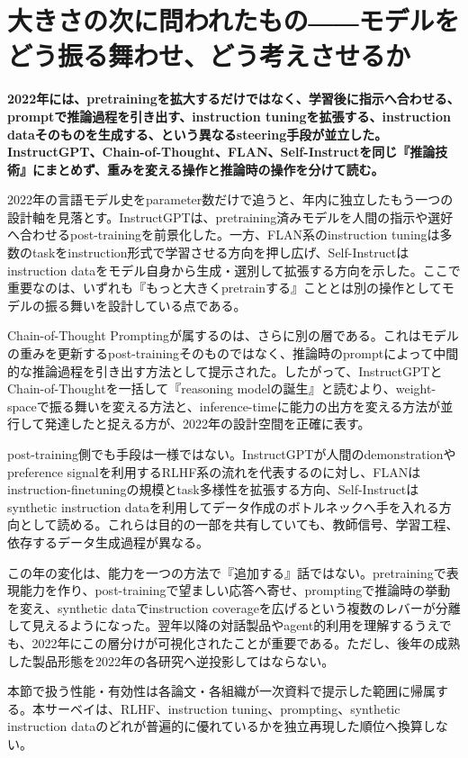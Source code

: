 \section{大きさの次に問われたもの――モデルをどう振る舞わせ、どう考えさせるか}
\label{pkg:steering-reasoning}
\noindent\textbf{2022年には、pretrainingを拡大するだけではなく、学習後に指示へ合わせる、promptで推論過程を引き出す、instruction tuningを拡張する、instruction dataそのものを生成する、という異なるsteering手段が並立した。InstructGPT、Chain-of-Thought、FLAN、Self-Instructを同じ『推論技術』にまとめず、重みを変える操作と推論時の操作を分けて読む。}\autocite{src-0c551201e765,src-87477ad8b476,src-a17359c66f6b,src-e58f1e9c8754,src-fadb2b92c538}

2022年の言語モデル史をparameter数だけで追うと、年内に独立したもう一つの設計軸を見落とす。InstructGPTは、pretraining済みモデルを人間の指示や選好へ合わせるpost-trainingを前景化した。一方、FLAN系のinstruction tuningは多数のtaskをinstruction形式で学習させる方向を押し広げ、Self-Instructはinstruction dataをモデル自身から生成・選別して拡張する方向を示した。ここで重要なのは、いずれも『もっと大きくpretrainする』こととは別の操作としてモデルの振る舞いを設計している点である。\autocite{src-0c551201e765,src-87477ad8b476,src-e58f1e9c8754,src-fadb2b92c538}


Chain-of-Thought Promptingが属するのは、さらに別の層である。これはモデルの重みを更新するpost-trainingそのものではなく、推論時のpromptによって中間的な推論過程を引き出す方法として提示された。したがって、InstructGPTとChain-of-Thoughtを一括して『reasoning modelの誕生』と読むより、weight-spaceで振る舞いを変える方法と、inference-timeに能力の出方を変える方法が並行して発達したと捉える方が、2022年の設計空間を正確に表す。\autocite{src-87477ad8b476,src-a17359c66f6b,src-e58f1e9c8754}


post-training側でも手段は一様ではない。InstructGPTが人間のdemonstrationやpreference signalを利用するRLHF系の流れを代表するのに対し、FLANはinstruction-finetuningの規模とtask多様性を拡張する方向、Self-Instructはsynthetic instruction dataを利用してデータ作成のボトルネックへ手を入れる方向として読める。これらは目的の一部を共有していても、教師信号、学習工程、依存するデータ生成過程が異なる。\autocite{src-0c551201e765,src-87477ad8b476,src-e58f1e9c8754,src-fadb2b92c538}


この年の変化は、能力を一つの方法で『追加する』話ではない。pretrainingで表現能力を作り、post-trainingで望ましい応答へ寄せ、promptingで推論時の挙動を変え、synthetic dataでinstruction coverageを広げるという複数のレバーが分離して見えるようになった。翌年以降の対話製品やagent的利用を理解するうえでも、2022年にこの層分けが可視化されたことが重要である。ただし、後年の成熟した製品形態を2022年の各研究へ逆投影してはならない。\autocite{src-0c551201e765,src-87477ad8b476,src-a17359c66f6b,src-e58f1e9c8754,src-fadb2b92c538}


\begin{claimboundary}
本節で扱う性能・有効性は各論文・各組織が一次資料で提示した範囲に帰属する。本サーベイは、RLHF、instruction tuning、prompting、synthetic instruction dataのどれが普遍的に優れているかを独立再現した順位へ換算しない。\autocite{src-87477ad8b476,src-a17359c66f6b,src-e58f1e9c8754}
\end{claimboundary}

